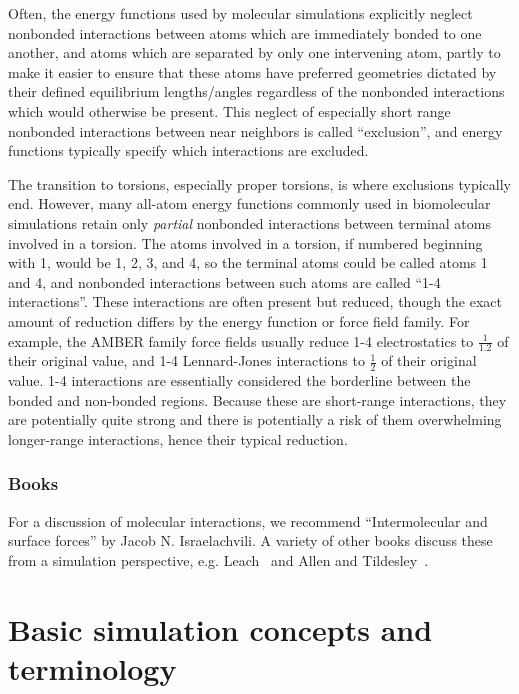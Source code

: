\documentclass[9pt,bestpractices]{livecoms}
\begin{document}
Often, the energy functions used by molecular simulations explicitly neglect nonbonded interactions between atoms which are immediately bonded to one
another, and atoms which are separated by only one intervening atom, partly to make it easier to ensure that these atoms have preferred geometries dictated by their defined equilibrium lengths/angles regardless of the nonbonded interactions which would otherwise be present.
This neglect of especially short range nonbonded interactions between near neighbors is called ``exclusion'', and energy functions typically specify which interactions are excluded.

The transition to torsions, especially proper torsions, is where exclusions typically end.
However, many all-atom energy functions commonly used in biomolecular simulations retain only \emph{partial} nonbonded interactions between terminal atoms involved in a torsion.
The atoms involved in a torsion, if numbered beginning with 1, would be 1, 2, 3, and 4, so the terminal atoms could be called atoms 1 and 4, and nonbonded interactions between such atoms are called ``1-4 interactions''.
These interactions are often present but reduced, though the exact amount of reduction differs by the energy function or force field family.
For example, the AMBER family force fields usually reduce 1-4 electrostatics to $\frac{1}{1.2}$ of their original value, and 1-4 Lennard-Jones interactions to $\frac{1}{2}$ of their original value.
1-4 interactions are essentially considered the borderline between the bonded and non-bonded regions.
Because these are short-range interactions, they are potentially quite strong and there is potentially a risk of them overwhelming longer-range interactions, hence their typical reduction.


\subsubsection{Books}
For a discussion of molecular interactions, we recommend ``Intermolecular and surface forces'' by Jacob N. Israelachvili.
A variety of other books discuss these from a simulation perspective, e.g. Leach~\cite{LeachBook} and Allen and Tildesley~\cite{allen_computer_2017}.


\section{Basic simulation concepts and terminology}
\label{sec:basics}
\end{document}
